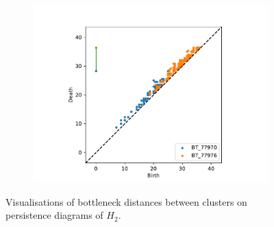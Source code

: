 \begin{figure}[ht]
\begin{subfigure}{.49 \linewidth}
  \includegraphics[scale=0.5]{matchings/77970-77976.pdf}
  \end{subfigure}
  \caption{\label{outgroup-matching} Visualisations of bottleneck distances between clusters on persistence diagrams of $H_{2}$.}
\end{figure}










